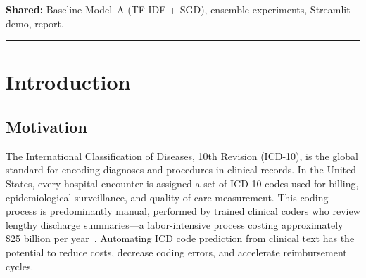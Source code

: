 \documentclass[11pt,a4paper]{article}
\begin{document}
\noindent\textbf{Shared:} Baseline Model~A (TF-IDF + SGD), ensemble experiments, Streamlit demo, report.

\noindent\rule{\textwidth}{0.5pt}
\vspace{6pt}

\begin{abstract}
Automated prediction of ICD-10 diagnosis codes from clinical discharge summaries is a critical task for reducing the \$25B annual cost of manual medical coding in the United States. We address this as a multi-label classification problem using the MIMIC-IV clinical database, predicting the top-50 most frequent ICD-10 codes from 122,304 hospital admissions. We establish a strong TF-IDF + SGD baseline (Micro-F1 = 0.60) and propose two neural approaches: (1)~a Chunk-BERT architecture with per-label attention that processes full documents via overlapping 512-token windows over Bio\_ClinicalBERT, and (2)~a BiLSTM with Label-Aware Attention (LAAT) that encodes up to 4,000 word tokens in a single pass. The BiLSTM-LAAT model achieves the best individual Micro-F1 of 0.72, a +0.12 improvement over the baseline, with balanced precision (0.72) and recall (0.72). A weighted ensemble of TF-IDF and BiLSTM-LAAT further improves performance to Micro-F1 = 0.72 and Micro-AUROC = 0.95. We provide a complete system including a Streamlit web demo, FastAPI service, and Docker deployment.
\end{abstract}

\section{Introduction}

\subsection{Motivation}
The International Classification of Diseases, 10th Revision (ICD-10), is the global standard for encoding diagnoses and procedures in clinical records. In the United States, every hospital encounter is assigned a set of ICD-10 codes used for billing, epidemiological surveillance, and quality-of-care measurement. This coding process is predominantly manual, performed by trained clinical coders who review lengthy discharge summaries---a labor-intensive process costing approximately \$25 billion per year~\cite{mullenbach2018explainable}. Automating ICD code prediction from clinical text has the potential to reduce costs, decrease coding errors, and accelerate reimbursement cycles.
\end{document}
